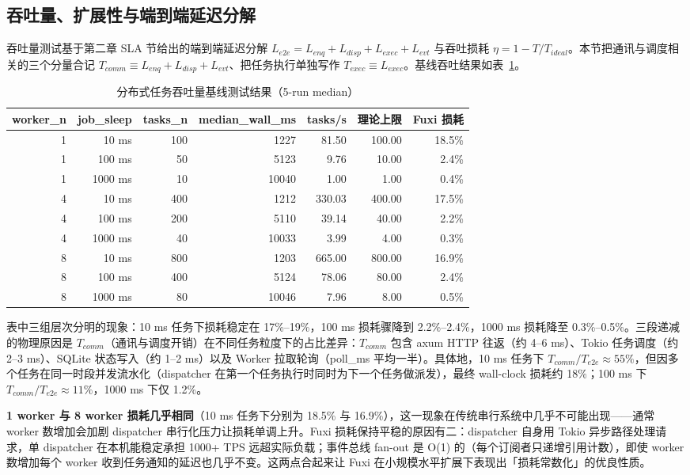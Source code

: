 \subsection{吞吐量、扩展性与端到端延迟分解}

吞吐量测试基于第二章 SLA 节给出的端到端延迟分解 $L_{e2e} = L_{enq} + L_{disp} + L_{exec} + L_{evt}$ 与吞吐损耗 $\eta = 1 - T/T_{ideal}$。本节把通讯与调度相关的三个分量合记 $T_{comm} \equiv L_{enq} + L_{disp} + L_{evt}$、把任务执行单独写作 $T_{exec} \equiv L_{exec}$。基线吞吐结果如表~\ref{tab:throughput}。

\begin{table}[H]
\centering
\caption{分布式任务吞吐量基线测试结果（5-run median）}
\label{tab:throughput}
\begin{tabular}{rrrrrrr}
\toprule
worker\_n & job\_sleep & tasks\_n & median\_wall\_ms & tasks/s & 理论上限 & Fuxi 损耗 \\
\midrule
1 & 10 ms & 100 & 1227 & 81.50 & 100.00 & 18.5\% \\
1 & 100 ms & 50 & 5123 & 9.76 & 10.00 & 2.4\% \\
1 & 1000 ms & 10 & 10040 & 1.00 & 1.00 & 0.4\% \\
4 & 10 ms & 400 & 1212 & 330.03 & 400.00 & 17.5\% \\
4 & 100 ms & 200 & 5110 & 39.14 & 40.00 & 2.2\% \\
4 & 1000 ms & 40 & 10033 & 3.99 & 4.00 & 0.3\% \\
8 & 10 ms & 800 & 1203 & 665.00 & 800.00 & 16.9\% \\
8 & 100 ms & 400 & 5124 & 78.06 & 80.00 & 2.4\% \\
8 & 1000 ms & 80 & 10046 & 7.96 & 8.00 & 0.5\% \\
\bottomrule
\end{tabular}
\end{table}

表中三组层次分明的现象：10 ms 任务下损耗稳定在 17\%--19\%，100 ms 损耗骤降到 2.2\%--2.4\%，1000 ms 损耗降至 0.3\%--0.5\%。三段递减的物理原因是 $T_{comm}$（通讯与调度开销）在不同任务粒度下的占比差异：$T_{comm}$ 包含 axum HTTP 往返（约 4--6 ms）、Tokio 任务调度（约 2--3 ms）、SQLite 状态写入（约 1--2 ms）以及 Worker 拉取轮询（poll\_ms 平均一半）。具体地，10 ms 任务下 $T_{comm}/T_{e2e} \approx 55\%$，但因多个任务在同一时段并发流水化（dispatcher 在第一个任务执行时同时为下一个任务做派发），最终 wall-clock 损耗约 18\%；100 ms 下 $T_{comm}/T_{e2e} \approx 11\%$，1000 ms 下仅 1.2\%。

\textbf{1 worker 与 8 worker 损耗几乎相同}（10 ms 任务下分别为 18.5\% 与 16.9\%），这一现象在传统串行系统中几乎不可能出现——通常 worker 数增加会加剧 dispatcher 串行化压力让损耗单调上升。Fuxi 损耗保持平稳的原因有二：dispatcher 自身用 Tokio 异步路径处理请求，单 dispatcher 在本机能稳定承担 1000+ TPS 远超实际负载；事件总线 fan-out 是 O(1) 的（每个订阅者只递增引用计数），即使 worker 数增加每个 worker 收到任务通知的延迟也几乎不变。这两点合起来让 Fuxi 在小规模水平扩展下表现出「损耗常数化」的优良性质。

